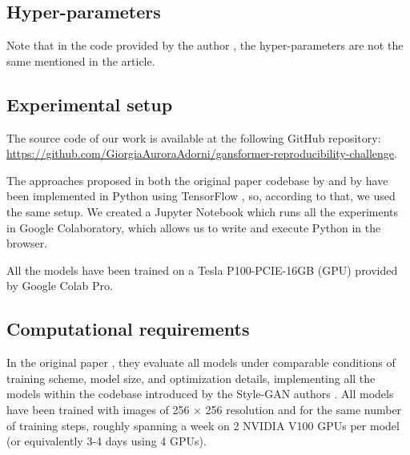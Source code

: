 \documentclass{article}
\begin{document}
	\subsection{Hyper-parameters}%
	
	Note that in the code provided by the author \cite{hudson2021generative}, the hyper-parameters are 
	not the same mentioned in the article. 
	
	
	
	\subsection{Experimental setup}	
	The source code of our work is available at the following GitHub repository: 
	\url{https://github.com/GiorgiaAuroraAdorni/gansformer-reproducibility-challenge}.
	 
	 The approaches proposed in both the original paper codebase by \citet{karras2020analyzing} and 
	 by \citet{hudson2021generative} have been implemented in Python using TensorFlow 
	 \cite{tensorflow2015-whitepaper}, so, according to that, we used the same setup.
	 We created a Jupyter Notebook which runs all the experiments in Google Colaboratory, which 
	 allows us to write and execute Python in the browser. %
	
	 All the models have been trained on a Tesla P100-PCIE-16GB (GPU) provided by Google 
	 Colab Pro.
	
	\subsection{Computational requirements}%
	In the original paper \cite{hudson2021generative}, they evaluate all models under comparable 
	conditions of training scheme, model size, and optimization details, implementing all the models 
	within the codebase introduced by the Style-GAN authors \cite{karras2020analyzing}. 
	All models have been trained with images of 256 × 256 resolution and for the 
	same number of training steps, roughly spanning a week on 2 NVIDIA V100 GPUs per model (or 
	equivalently 3-4 days using 4 GPUs). 
	
\end{document}
